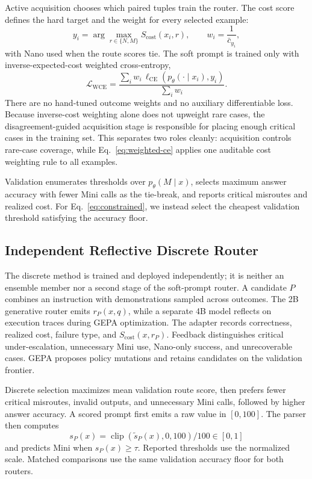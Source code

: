 Active acquisition chooses which paired tuples train the router. The cost score
defines the hard target and the weight for every selected example:
\begin{equation}
 y_i=\arg\max_{r\in\{N,M\}}S_{\mathrm{cost}}(x_i,r),
 \qquad
 w_i=\frac{1}{\bar c_{y_i}},
 \label{eq:cost-target-weight}
\end{equation}
with Nano used when the route scores tie. The soft prompt is trained only with
inverse-expected-cost weighted cross-entropy,
\begin{equation}
 \mathcal{L}_{\mathrm{WCE}}=
 \frac{\sum_i w_i\,
 \ell_{\mathrm{CE}}\!\left(p_\theta(\cdot\mid x_i),y_i\right)}
 {\sum_i w_i}.
 \label{eq:weighted-ce}
\end{equation}
There are no hand-tuned outcome weights and no auxiliary differentiable loss.
Because inverse-cost weighting alone does not upweight rare \mo cases, the
disagreement-guided acquisition stage is responsible for placing enough critical cases
in the training set. This separates two roles cleanly: acquisition controls
rare-case coverage, while Eq.~\ref{eq:weighted-ce} applies one auditable cost
weighting rule to all examples.

Validation enumerates thresholds over $p_\theta(M\mid x)$, selects maximum
answer accuracy with fewer Mini calls as the tie-break, and reports critical
misroutes and realized cost. For Eq.~\ref{eq:constrained}, we instead select the
cheapest validation threshold satisfying the accuracy floor.

\subsection{Independent Reflective Discrete Router}

The discrete method is trained and deployed independently; it is neither an
ensemble member nor a second stage of the soft-prompt router. A candidate $P$
combines an instruction with demonstrations sampled across outcomes. The
2B generative router emits $r_P(x,q)$, while a separate 4B model reflects on
execution traces during GEPA optimization. The adapter records correctness,
realized cost, failure type, and $S_{\mathrm{cost}}(x,r_P)$. Feedback
distinguishes critical under-escalation, unnecessary Mini use, Nano-only
success, and unrecoverable \bw cases. GEPA proposes policy mutations and
retains candidates on the validation frontier.

Discrete selection maximizes mean validation route score, then prefers fewer
critical misroutes, invalid outputs, and unnecessary Mini calls, followed by
higher answer accuracy. A scored prompt first emits a raw value in
$[0,100]$. The parser then computes
\[
s_P(x)=\operatorname{clip}(\tilde{s}_P(x),0,100)/100\in[0,1]
\]
and predicts Mini when $s_P(x)\ge\tau$. Reported thresholds use the
normalized scale.
Matched comparisons use the same validation accuracy floor for both routers. 
